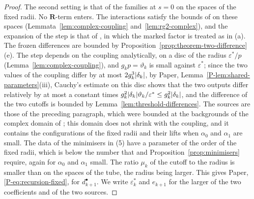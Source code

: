 \documentclass[11pt]{preprint}
\DeclarePairedDelimiter{\abs}{\lvert}{\rvert}
\numberwithin{equation}{section}
\theoremstyle{definition}
\theoremstyle{remark}
\theoremstyle{plain}
\begin{document}
\begin{proof}
The second setting is that of the families at $s = 0$ on the spaces of the fixed radii. No $\mathbf R$-term enters. The interactions satisfy the bounds of \cite{BalabanRG2} on these spaces (Lemmata~\ref{lem:complex-coupling} and~\ref{lem:rg2-complex}), and the expansion of the step is that of \cite[Sect.~2]{BalabanRG2}, in which the marked factor is treated as in (a). The frozen differences are bounded by Proposition~\ref{prop:theorem-two-difference}(e). The step depends on the coupling analytically, on a disc of the radius $\varepsilon^*/p$ (Lemma~\ref{lem:complex-coupling}), and $g_kp = \vartheta_k$ is small against $\varepsilon^*$; since the two values of the coupling differ by at most $2g_k^3\abs{\delta_k}$, by Paper, Lemma~\ref{P-lem:shared-parameters}(iii), Cauchy's estimate on this disc shows that the two outputs differ relatively by at most a constant times $g_k^2\abs{\delta_k}\vartheta_k/\varepsilon^* \leq g_k^2\abs{\delta_k}$, and the difference of the two cutoffs is bounded by Lemma~\ref{lem:threshold-differences}. The sources are those of the preceding paragraph, which were bounded at the backgrounds of the complex domain of \cite[(3.37), p.~396]{BalabanPBG}; this domain does not shrink with the coupling, and it contains the configurations of the fixed radii and their lifts when $\alpha_0$ and $\alpha_1$ are small. The data of the minimisers in (5) have a parameter of the order of the fixed radii, which is below the number that \cite[Theorem~1, p.~279]{BalabanVAR} and Proposition~\ref{prop:minimisers} require, again for $\alpha_0$ and $\alpha_1$ small. The ratio $\mu_k$ of the cutoff to the radius is smaller than on the spaces of the tube, the radius being larger. This gives Paper, \eqref{P-eq:recursion-fixed}, for $d^\bullet_{k+1}$. We write $\varepsilon^*_k$ and $e_{k+1}$ for the larger of the two coefficients and of the two sources.


\end{proof}
\end{document}
